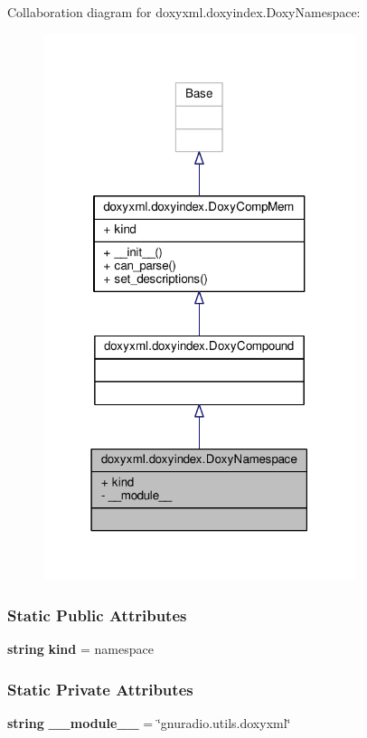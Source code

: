 Collaboration diagram for doxyxml.\+doxyindex.\+Doxy\+Namespace\+:
\nopagebreak
\begin{figure}[H]
\begin{center}
\leavevmode
\includegraphics[width=259pt]{d8/d8e/classdoxyxml_1_1doxyindex_1_1DoxyNamespace__coll__graph}
\end{center}
\end{figure}
\subsubsection*{Static Public Attributes}
\begin{DoxyCompactItemize}
\item 
{\bf string} {\bf kind} = \textquotesingle{}namespace\textquotesingle{}
\end{DoxyCompactItemize}
\subsubsection*{Static Private Attributes}
\begin{DoxyCompactItemize}
\item 
{\bf string} {\bf \+\_\+\+\_\+module\+\_\+\+\_\+} = \char`\"{}gnuradio.\+utils.\+doxyxml\char`\"{}
\end{DoxyCompactItemize}
